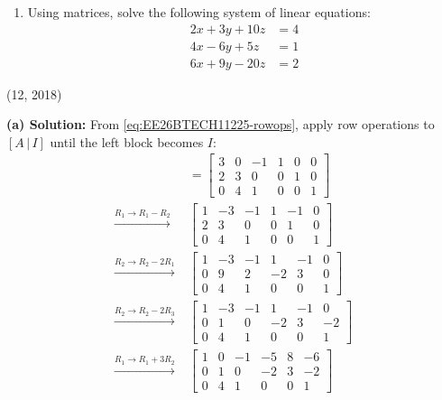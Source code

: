 \begin{enumerate}[label=\thesubsection.\arabic*, ref=\thesubsection.\theenumi]
\begin{enumerate}[label=(\alph*), leftmargin=1.5em, labelsep=0.5em]
        \begin{center}
            \textbf{OR}
        \end{center}

        \item Using matrices, solve the following system of linear equations:
        \begin{align*}
            2x+3y+10z &= 4 \\
            4x-6y+5z &= 1 \\
            6x+9y-20z &= 2
        \end{align*}
    \end{enumerate} \vspace{2pt}

\par\hfill (12, 2018)\par
\textbf{(a) Solution:} From \eqref{eq:EE26BTECH11225-rowops}, apply row operations to $[A\,|\,I]$ until the left block becomes $I$:
\begin{align*}
    [A|I] &= \left[\begin{array}{ccc|ccc} 3 & 0 & -1 & 1 & 0 & 0 \\ 2 & 3 & 0 & 0 & 1 & 0 \\ 0 & 4 & 1 & 0 & 0 & 1 \end{array}\right] \\
    \xrightarrow{R_1\to R_1-R_2}\; &\left[\begin{array}{ccc|ccc} 1 & -3 & -1 & 1 & -1 & 0 \\ 2 & 3 & 0 & 0 & 1 & 0 \\ 0 & 4 & 1 & 0 & 0 & 1 \end{array}\right] \\
    \xrightarrow{R_2\to R_2-2R_1}\; &\left[\begin{array}{ccc|ccc} 1 & -3 & -1 & 1 & -1 & 0 \\ 0 & 9 & 2 & -2 & 3 & 0 \\ 0 & 4 & 1 & 0 & 0 & 1 \end{array}\right] \\
    \xrightarrow{R_2\to R_2-2R_3}\; &\left[\begin{array}{ccc|ccc} 1 & -3 & -1 & 1 & -1 & 0 \\ 0 & 1 & 0 & -2 & 3 & -2 \\ 0 & 4 & 1 & 0 & 0 & 1 \end{array}\right] \\
    \xrightarrow{R_1\to R_1+3R_2}\; &\left[\begin{array}{ccc|ccc} 1 & 0 & -1 & -5 & 8 & -6 \\ 0 & 1 & 0 & -2 & 3 & -2 \\ 0 & 4 & 1 & 0 & 0 & 1 \end{array}\right] \\

\end{align*}
\end{enumerate}
